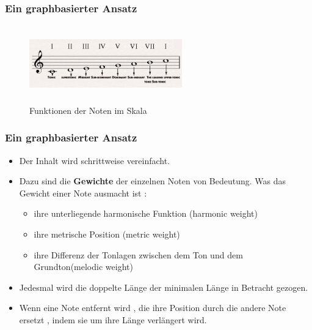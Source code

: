 \documentclass{beamer}
\begin{document}
	\begin{frame}
		\frametitle{Ein graphbasierter Ansatz}
		\begin{figure}[h!]
			\includegraphics[width=250px,height=125px,keepaspectratio]{functional_degrees}
			\caption{Funktionen der Noten im Skala \cite{functional_degrees_source}} 
		\end{figure}
	\end{frame}


	\begin{frame}
		\frametitle{Ein graphbasierter Ansatz}
		\begin{itemize}
				\item Der Inhalt wird schrittweise vereinfacht.
				\item Dazu sind die \textbf{Gewichte} der einzelnen Noten von Bedeutung. Was das Gewicht einer Note ausmacht ist : 
					\begin{itemize}
						\item ihre unterliegende harmonische Funktion (harmonic weight)
						\item ihre metrische Position (metric weight)
						\item ihre Differenz der Tonlagen zwischen dem Ton und dem Grundton(melodic weight)
					\end{itemize}
				\item Jedesmal wird die doppelte Länge der minimalen Länge in Betracht gezogen.
				\item Wenn eine Note entfernt wird , die ihre Position durch die andere Note ersetzt , indem sie um ihre Länge verlängert wird.
		\end{itemize}
	\end{frame}
\end{document}

